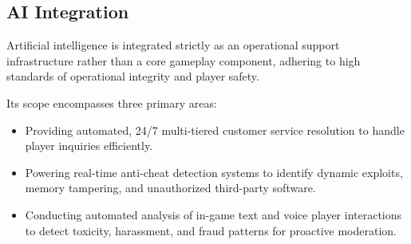 \subsection{AI Integration}
Artificial intelligence is integrated strictly as an operational support infrastructure rather than a core gameplay component,
adhering to high standards of operational integrity and player safety.

Its scope encompasses three primary areas:
\begin{itemize}
  \item Providing automated, 24/7 multi-tiered customer service resolution to handle player inquiries efficiently.
  \item Powering real-time anti-cheat detection systems to identify dynamic exploits, memory tampering, and
  unauthorized third-party software.
  \item Conducting automated analysis of in-game text and voice player interactions to detect toxicity, harassment, and fraud
  patterns for proactive moderation.
\end{itemize}
